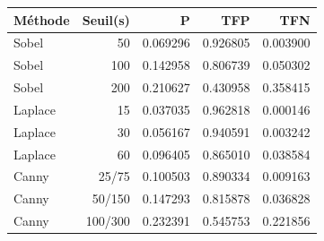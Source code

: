 \begin{tabular}{lrrrr}
\toprule
Méthode & Seuil(s) & P & TFP & TFN\\
\midrule
Sobel & 50 & 0.069296 & 0.926805 & 0.003900\\
Sobel & 100 & 0.142958 & 0.806739 & 0.050302\\
Sobel & 200 & 0.210627 & 0.430958 & 0.358415\\
Laplace & 15 & 0.037035 & 0.962818 & 0.000146\\
Laplace & 30 & 0.056167 & 0.940591 & 0.003242\\
Laplace & 60 & 0.096405 & 0.865010 & 0.038584\\
Canny & 25/75 & 0.100503 & 0.890334 & 0.009163\\
Canny & 50/150 & 0.147293 & 0.815878 & 0.036828\\
Canny & 100/300 & 0.232391 & 0.545753 & 0.221856\\
\bottomrule
\end{tabular}
